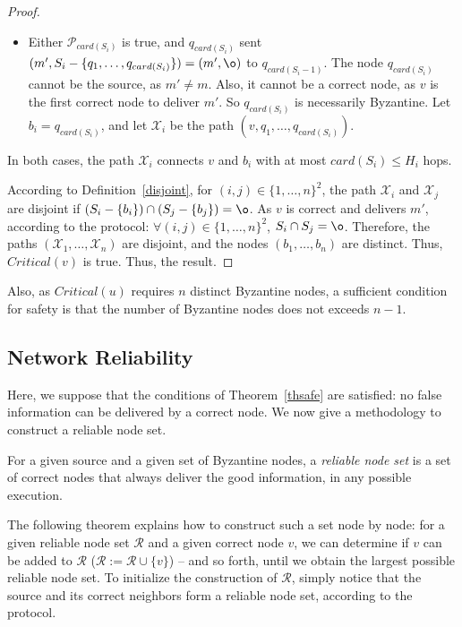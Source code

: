 \documentclass[a4paper,11pt]{article}
\begin{document}
\begin{proof}
\begin{itemize}
\item Either $\mathcal{P}_{card(S_i)}$ is true, and $q_{card(S_i)}$ sent $(m',S_i-\{q_1,\dots,q_{card(S_i)}\}) = (m',\o)$ to $q_{card(S_i-1)}$.
The node $q_{card(S_i)}$ cannot be the source, as $m' \neq m$. Also, it cannot be a correct node, as $v$ is the first correct node to deliver $m'$.
So $q_{card(S_i)}$ is necessarily Byzantine. Let $b_i = q_{card(S_i)}$, and let $\mathcal{X}_i$ be the path $(v,q_1,\dots,q_{card(S_i)})$.
\end{itemize}

In both cases, the path $\mathcal{X}_i$ connects $v$ and $b_i$ with at most $card(S_i) \leq H_i$ hops.



According to Definition~\ref{disjoint}, for $(i,j) \in \{1,\dots,n\}^2$, the path $\mathcal{X}_i$ and $ \mathcal{X}_j$ are disjoint if $(S_i-\{b_i\}) \cap (S_j-\{b_j\}) = \o$.
As $v$ is correct and delivers $m'$, according to the protocol: $\forall (i,j) \in \{1,\dots,n\}^2$, $S_i \cap S_j = \o$.
Therefore, the paths $(\mathcal{X}_1,\dots,\mathcal{X}_n)$ are disjoint, and the nodes $(b_1,\dots,b_n)$ are distinct. Thus, $Critical(v)$ is true. Thus, the result.


\end{proof}

Also, as $Critical(u)$ requires $n$ distinct Byzantine nodes, a sufficient condition for safety is that the number of Byzantine nodes does not exceeds $n - 1$.


\subsection{Network Reliability}
\label{relnet}

Here, we suppose that the conditions of Theorem~\ref{thsafe} are satisfied: no false information can be delivered by a correct node.
We now give a methodology to construct a reliable node set.

\label{partrel}

\begin{definition}
\label{rns}
For a given source and a given set of Byzantine nodes,
a \emph{reliable node set} is a set of correct nodes that always deliver the good information, in any possible execution.
\end{definition}

The following theorem explains how to construct such a set node by node: for a given reliable node set $\mathcal{R}$ and a given correct node $v$, we can determine if $v$ can be added to $\mathcal{R}$ ($\mathcal{R} := \mathcal{R} \cup \{v\}$) -- and so forth, until we obtain the largest possible reliable node set.
To initialize the construction of $\mathcal{R}$, simply notice that the source and its correct neighbors form a reliable node set, according to the protocol.
\end{document}
